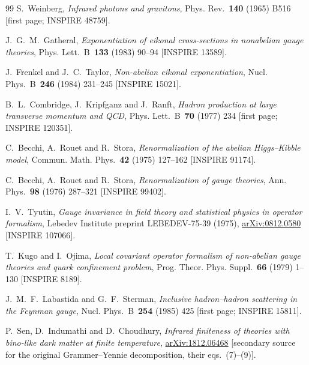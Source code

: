 \begin{thebibliography}{99}
S.~Weinberg, \emph{Infrared photons and gravitons}, Phys. Rev.~\textbf{140} (1965) \mbox{B516} [first page; INSPIRE 48759].

J.~G.~M.~Gatheral, \emph{Exponentiation of eikonal cross-sections in nonabelian gauge theories}, Phys. Lett.~B~\textbf{133} (1983) \mbox{90--94} [INSPIRE 13589].

J.~Frenkel and J.~C.~Taylor, \emph{Non-abelian eikonal exponentiation}, Nucl. Phys.~B~\textbf{246} (1984) \mbox{231--245} [INSPIRE 15021].

B.~L.~Combridge, J.~Kripfganz and J.~Ranft, \emph{Hadron production at large transverse momentum and QCD}, Phys. Lett.~B~\textbf{70} (1977) \mbox{234} [first page; INSPIRE 120351].

C.~Becchi, A.~Rouet and R.~Stora, \emph{Renormalization of the abelian Higgs--Kibble model}, Commun. Math. Phys.~\textbf{42} (1975) \mbox{127--162} [INSPIRE 91174].

C.~Becchi, A.~Rouet and R.~Stora, \emph{Renormalization of gauge theories}, Ann. Phys.~\textbf{98} (1976) \mbox{287--321} [INSPIRE 99402].

I.~V.~Tyutin, \emph{Gauge invariance in field theory and statistical physics in operator formalism}, Lebedev Institute preprint LEBEDEV-75-39 (1975), \href{https://arxiv.org/abs/0812.0580}{arXiv:0812.0580} [INSPIRE 107066].

T.~Kugo and I.~Ojima, \emph{Local covariant operator formalism of non-abelian gauge theories and quark confinement problem}, Prog. Theor. Phys. Suppl.~\textbf{66} (1979) \mbox{1--130} [INSPIRE 8189].

J.~M.~F.~Labastida and G.~F.~Sterman, \emph{Inclusive hadron--hadron scattering in the Feynman gauge}, Nucl. Phys.~B~\textbf{254} (1985) \mbox{425} [first page; INSPIRE 15811].

P.~Sen, D.~Indumathi and D.~Choudhury, \emph{Infrared finiteness of theories with bino-like dark matter at finite temperature}, \href{https://arxiv.org/abs/1812.06468}{arXiv:1812.06468} [secondary source for the original Grammer--Yennie decomposition, their eqs.~(7)--(9)].

\end{thebibliography}
